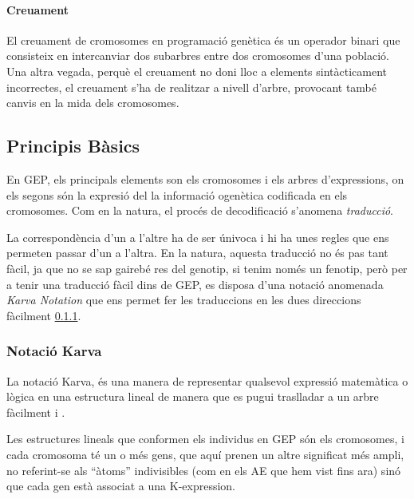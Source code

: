 \paragraph{Creuament} %
\label{par:Creuament}
El creuament de cromosomes en programació genètica és un operador binari que
consisteix en intercanviar dos subarbres entre dos cromosomes d'una població.
Una altra vegada, perquè el creuament no doni lloc a elements sintàcticament
incorrectes, el creuament s'ha de realitzar a nivell d'arbre, provocant també
canvis en la mida dels cromosomes.



\subsection{Principis Bàsics} %
\label{sub:Principis Basics}

En GEP, els principals elements son els cromosomes i els arbres d'expressions,
on els segons són la expresió del la informació ogenètica codificada en els
cromosomes.  Com en la natura, el procés de decodificació s'anomena
\emph{traducció}.

La correspondència d'un a l'altre ha de ser únivoca i hi ha unes regles que ens
permeten passar d'un a l'altra.  En la natura, aquesta traducció no és pas tant
fàcil, ja que no se sap gairebé res del genotip, si tenim només un fenotip, però
per a tenir una traducció fàcil dins de GEP, es disposa d'una notació anomenada
\emph{Karva Notation} que ens permet fer les traduccions en les dues direccions
fàcilment \ref{ssub:Notacio Karva}.



\subsubsection{Notació Karva} %
\label{ssub:Notacio Karva}

La notació Karva, és una manera de representar qualsevol expressió matemàtica o
lògica en una estructura lineal de manera que es pugui traslladar a un arbre
fàcilment \cite{ferreira:2001} i \cite{ferreira:2006}.

Les estructures lineals que conformen els individus en GEP són els cromosomes,
i cada cromosoma té un o més gens, que aquí prenen un altre significat més
ampli, no referint-se als ``àtoms'' indivisibles (com en els AE que hem vist
fins ara) sinó que cada gen està associat a una K-expression.
\cite{ferreira:2007}

